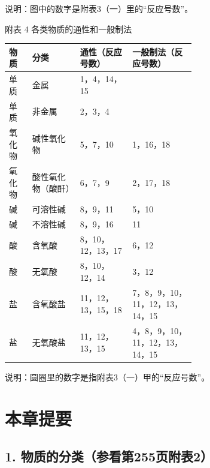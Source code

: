 说明：图中的数字是附表3（一）里的``反应号数''。

附表 4 各类物质的通性和一般制法

{\def\LTcaptype{none}%
\small\setlength{\tabcolsep}{4pt}%
\begin{longtable}[]{@{}llp{0.28\linewidth}p{0.34\linewidth}@{}}
\toprule\noalign{}
物质 & 分类 & 通性（反应号数） & 一般制法（反应号数） \\
\midrule\noalign{}
\endhead
\bottomrule\noalign{}
\endlastfoot
单质 & 金属 & 1，4，14，15 & \\
单质 & 非金属 & 2，3，4 & \\
氧化物 & 碱性氧化物 & 5，7，10 & 1，16，18 \\
氧化物 & 酸性氧化物（酸酐） & 6，7，9 & 2，17，18 \\
碱 & 可溶性碱 & 8，9，11 & 5，10 \\
碱 & 不溶性碱 & 8，9，16 & 11 \\
酸 & 含氧酸 & 8，10，12，13，17 & 6，12 \\
酸 & 无氧酸 & 8，10，12，14 & 3，12 \\
盐 & 含氧酸盐 & 11，12，13，15，18 & 7，8，9，10，11，12，13，14，15 \\
盐 & 无氧酸盐 & 11，12，13，15 & 4，8，9，10，11，12，13，14，15 \\
\end{longtable}
}

说明：圆圈里的数字是指附表3（一）甲的``反应号数''。

\section{本章提要}

\subsection{1. 物质的分类（参看第255页附表2）}

